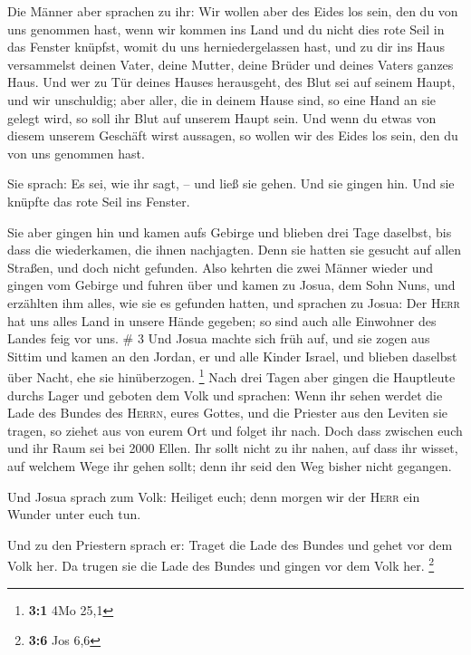  Die Männer aber sprachen zu ihr: Wir wollen aber des
Eides los sein, den du von uns genommen hast,  wenn wir
kommen ins Land und du nicht dies rote Seil in das Fenster knüpfst,
womit du uns herniedergelassen hast, und zu dir ins Haus versammelst
deinen Vater, deine Mutter, deine Brüder und deines Vaters ganzes Haus.
 Und wer zu Tür deines Hauses herausgeht, des Blut sei
auf seinem Haupt, und wir unschuldig; aber aller, die in deinem Hause
sind, so eine Hand an sie gelegt wird, so soll ihr Blut auf unserem
Haupt sein.  Und wenn du etwas von diesem unserem
Geschäft wirst aussagen, so wollen wir des Eides los sein, den du von
uns genommen hast.

 Sie sprach: Es sei, wie ihr sagt, -- und ließ sie gehen.
Und sie gingen hin. Und sie knüpfte das rote Seil ins Fenster.

 Sie aber gingen hin und kamen aufs Gebirge und blieben
drei Tage daselbst, bis dass die wiederkamen, die ihnen nachjagten. Denn
sie hatten sie gesucht auf allen Straßen, und doch nicht gefunden.
 Also kehrten die zwei Männer wieder und gingen vom
Gebirge und fuhren über und kamen zu Josua, dem Sohn Nuns, und erzählten
ihm alles, wie sie es gefunden hatten,  und sprachen zu
Josua: Der \textsc{Herr} hat uns alles Land in unsere Hände gegeben; so
sind auch alle Einwohner des Landes feig vor uns. \# 3 
Und Josua machte sich früh auf, und sie zogen aus Sittim und kamen an
den Jordan, er und alle Kinder Israel, und blieben daselbst über Nacht,
ehe sie hinüberzogen. \footnote{\textbf{3:1} 4Mo 25,1} 
Nach drei Tagen aber gingen die Hauptleute durchs Lager 
und geboten dem Volk und sprachen: Wenn ihr sehen werdet die Lade des
Bundes des \textsc{Herrn}, eures Gottes, und die Priester aus den
Leviten sie tragen, so ziehet aus von eurem Ort und folget ihr nach.
 Doch dass zwischen euch und ihr Raum sei bei 2000 Ellen.
Ihr sollt nicht zu ihr nahen, auf dass ihr wisset, auf welchem Wege ihr
gehen sollt; denn ihr seid den Weg bisher nicht gegangen.

 Und Josua sprach zum Volk: Heiliget euch; denn morgen wir
der \textsc{Herr} ein Wunder unter euch tun.

 Und zu den Priestern sprach er: Traget die Lade des
Bundes und gehet vor dem Volk her. Da trugen sie die Lade des Bundes und
gingen vor dem Volk her. \footnote{\textbf{3:6} Jos 6,6}

